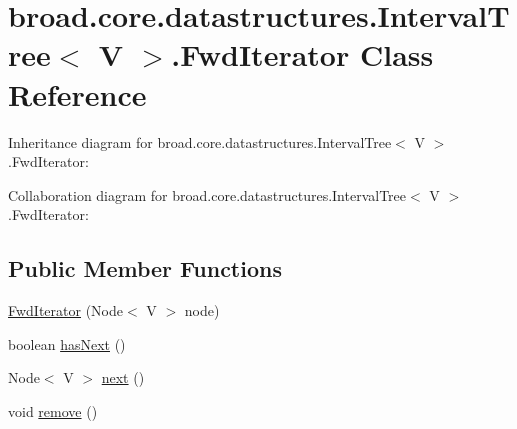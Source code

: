 \hypertarget{classbroad_1_1core_1_1datastructures_1_1_interval_tree_3_01_v_01_4_1_1_fwd_iterator}{\section{broad.\+core.\+datastructures.\+Interval\+Tree$<$ V $>$.Fwd\+Iterator Class Reference}
\label{classbroad_1_1core_1_1datastructures_1_1_interval_tree_3_01_v_01_4_1_1_fwd_iterator}
}


Inheritance diagram for broad.\+core.\+datastructures.\+Interval\+Tree$<$ V $>$.Fwd\+Iterator\+:


Collaboration diagram for broad.\+core.\+datastructures.\+Interval\+Tree$<$ V $>$.Fwd\+Iterator\+:
\subsection*{Public Member Functions}
\begin{DoxyCompactItemize}
\item 
\hyperlink{classbroad_1_1core_1_1datastructures_1_1_interval_tree_3_01_v_01_4_1_1_fwd_iterator_a7315e51f1548ee09e1cd16d03ba359f7}{Fwd\+Iterator} (Node$<$ V $>$ node)
\item 
boolean \hyperlink{classbroad_1_1core_1_1datastructures_1_1_interval_tree_3_01_v_01_4_1_1_fwd_iterator_a3a247f4caa559a2b29673a1375ce0b37}{has\+Next} ()
\item 
Node$<$ V $>$ \hyperlink{classbroad_1_1core_1_1datastructures_1_1_interval_tree_3_01_v_01_4_1_1_fwd_iterator_a5f39bf11e77a8b440f712006dee0f764}{next} ()
\item 
void \hyperlink{classbroad_1_1core_1_1datastructures_1_1_interval_tree_3_01_v_01_4_1_1_fwd_iterator_a33f3ad5279e177c569eab3fef6059498}{remove} ()
\end{DoxyCompactItemize}


